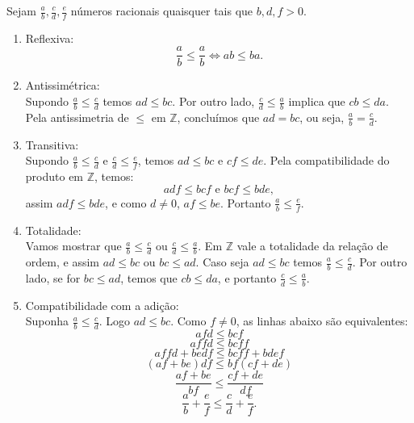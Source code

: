 \documentclass[../main.tex]{subfiles}
\begin{document}
\begin{dem}
    Sejam $\frac{a}{b}, \frac{c}{d}, \frac{e}{f}$ números racionais quaisquer tais que $b,d,f > 0$.
    \begin{enumerate}[label=(\roman*)]
        \item Reflexiva: \\
        \[ \frac{a}{b} \leq \frac{a}{b} \iff ab \leq ba. \]
        
        \item Antissimétrica: \\
        Supondo $\frac{a}{b} \leq \frac{c}{d}$ temos $ad \leq bc$. Por outro lado, $\frac{c}{d} \leq \frac{a}{b} $ implica que  $ cb \leq da$. Pela antissimetria de $\leq$ em $\mathbb{Z}$, concluímos que $ad = bc$, ou seja, $\frac{a}{b} = \frac{c}{d}$.
        
        \item Transitiva: \\
        Supondo $\frac{a}{b} \leq \frac{c}{d}$ e $\frac{c}{d} \leq \frac{e}{f}$, temos $ad \leq bc$ e $cf \leq de$.
        Pela compatibilidade do produto em $\mathbb{Z}$, temos: 
        \[adf \leq bcf \text{ e } bcf \leq bde, \]
        assim  $adf \leq bde$, e como $d \neq 0$, $af \leq be$. Portanto $\frac{a}{b} \leq \frac{e}{f}$.

        
        \item Totalidade: \\
        Vamos mostrar que $\frac{a}{b} \leq \frac{c}{d}$ ou $\frac{c}{d} \leq \frac{a}{b}$.
        Em $\mathbb{Z}$ vale a totalidade da relação de ordem, e assim $ad \leq bc$ ou $bc \leq ad$. Caso seja $ad \leq  bc$ temos $\frac{a}{b} \leq \frac{c}{d}$. Por outro lado, se for $bc \leq ad$, temos que $cb \leq da$, e portanto $\frac{c}{d} \leq \frac{a}{b}$. 
        
        \item Compatibilidade com a adição: \\
        Suponha $\frac{a}{b} \leq \frac{c}{d}$. Logo $ad \leq bc$. Como $f \neq 0$, as linhas abaixo são equivalentes:
        \[ afd \leq bcf \]
        \[affd \leq bcff\]
        \[ affd + bedf \leq bcff + bdef \]   
        \[ (af+be)df \leq bf(cf+de) \]
        \[ \frac{af+be}{bf} \leq \frac{cf+de}{df} \]
        \[ \frac{a}{b} + \frac{e}{f} \leq \frac{c}{d} + \frac{e}{f}. \]
        

\end{enumerate}
\end{dem}
\end{document}
